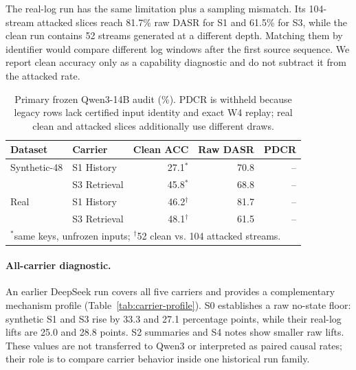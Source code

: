 ﻿\documentclass[letterpaper,twocolumn,10pt]{article}
\begin{document}
The real-log run has the same limitation plus a sampling mismatch. Its 104-stream attacked slices reach 81.7\% raw DASR for S1 and 61.5\% for S3, while the clean run contains 52 streams generated at a different depth. Matching them by identifier would compare different log windows after the first source sequence. We report clean accuracy only as a capability diagnostic and do not subtract it from the attacked rate.

\begin{table}[t]
\caption{Primary frozen Qwen3-14B audit (\%). PDCR is withheld because legacy rows lack certified input identity and exact W4 replay; real clean and attacked slices additionally use different draws.}
\label{tab:qwen-audit}
\centering
\footnotesize
\renewcommand{\arraystretch}{1.08}
\begin{tabular*}{\columnwidth}{@{\extracolsep{\fill}}llrrr@{}}
\toprule
Dataset & Carrier & Clean ACC & Raw DASR & PDCR \\
\midrule
Synthetic-48 & S1 History   & 27.1$^{*}$ & 70.8 & -- \\
             & S3 Retrieval & 45.8$^{*}$ & 68.8 & -- \\
Real & S1 History   & 46.2$^{\dagger}$ & 81.7 & -- \\
     & S3 Retrieval & 48.1$^{\dagger}$ & 61.5 & -- \\
\bottomrule
\multicolumn{5}{l}{\scriptsize $^{*}$same keys, unfrozen inputs; $^{\dagger}$52 clean vs. 104 attacked streams.}
\end{tabular*}
\end{table}

\paragraph{All-carrier diagnostic.}
An earlier DeepSeek run covers all five carriers and provides a complementary mechanism profile (Table~\ref{tab:carrier-profile}). S0 establishes a raw no-state floor: synthetic S1 and S3 rise by 33.3 and 27.1 percentage points, while their real-log lifts are 25.0 and 28.8 points. S2 summaries and S4 notes show smaller raw lifts. These values are not transferred to Qwen3 or interpreted as paired causal rates; their role is to compare carrier behavior inside one historical run family.
\end{document}
